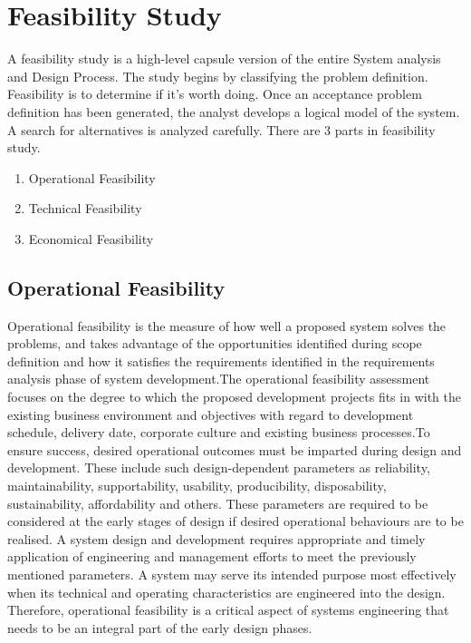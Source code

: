 \section{Feasibility Study}
\par A feasibility study is a high-level capsule version of the entire System analysis and Design Process.
The study begins by classifying the problem definition. Feasibility is to determine if it’s worth
doing. Once an acceptance problem definition has been generated, the analyst develops a logical
model of the system. A search for alternatives is analyzed carefully. There are 3 parts in feasibility
study.
\begin{enumerate}
\item Operational Feasibility
\item Technical Feasibility
\item Economical Feasibility
\end{enumerate}

\subsection{Operational Feasibility}

\par Operational feasibility is the measure of how well a proposed system solves the problems, and takes
advantage of the opportunities identified during scope definition and how it satisfies the
requirements identified in the requirements analysis phase of system development.The operational
feasibility assessment focuses on the degree to which the proposed development projects fits in with
the existing business environment and objectives with regard to development schedule, delivery
date, corporate culture and existing business processes.To ensure success, desired operational
outcomes must be imparted during design and development. These include such design-dependent
parameters as reliability, maintainability, supportability, usability, producibility, disposability,
sustainability, affordability and others. These parameters are required to be considered at the early
stages of design if desired operational behaviours are to be realised. A system design and
development requires appropriate and timely application of engineering and management efforts to
meet the previously mentioned parameters. A system may serve its intended purpose most
effectively when its technical and operating characteristics are engineered into the design.
Therefore, operational feasibility is a critical aspect of systems engineering that needs to be an
integral part of the early design phases.

